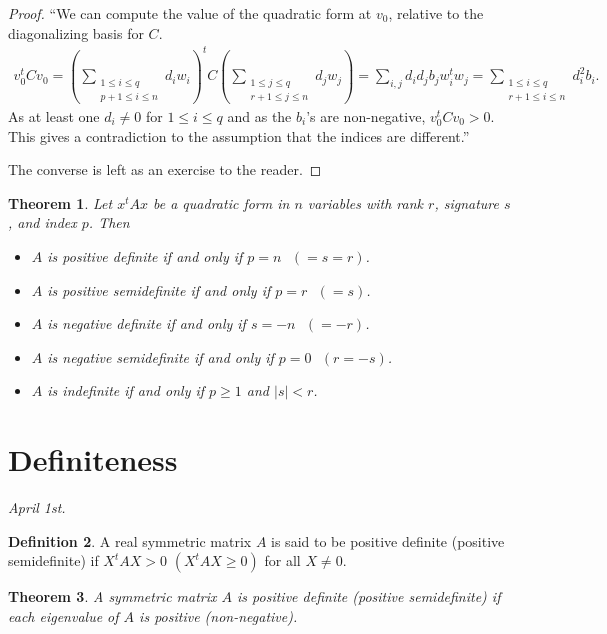 \documentclass[15pt,a4paper]{book}
\newtheorem{theorem}{Theorem}[chapter]
\theoremstyle{definition}
\newtheorem{definition}[theorem]{Definition}
\newcommand{\abs}[1]{\left| #1 \right|} %
\begin{document}
\begin{proof}
    ``We can compute the value of the quadratic form at $v_{0}$, relative to the diagonalizing basis for $C$.
    \begin{align}
        v_{0}^{t}Cv_{0} = (\sum_{\substack{1\leq i\leq q\\ p+1 \leq i \leq n}}d_{i}w_{i})^{t}C (\sum_{\substack{1 \leq j \leq q\\r+1 \leq j \leq n}}d_{j}w_{j}) = \sum_{i,j} d_{i}d_{j}b_{j}w_{i}^{t}w_{j} = \sum_{\substack{1 \leq i \leq q\\r+1 \leq i \leq n}} d_{i}^{2}b_{i}.
    \end{align}
    As at least one $d_{i} \neq 0$ for $1 \leq i \leq q$ and as the $b_{i}$'s are non-negative, $v_{0}^{t}Cv_{0} > 0$. This gives a contradiction to the assumption that the indices are different.''

    The converse is left as an exercise to the reader.
\end{proof}

\begin{theorem}
    Let $x^{t}Ax$ be a quadratic form in $n$ variables with rank $r$, signature $s$, and index $p$. Then
    \begin{itemize}
        \item $A$ is positive definite if and only if $p = n \text{ }(= s = r)$.
        \item $A$ is positive semidefinite if and only if $p = r \text{ } (= s)$.
        \item $A$ is negative definite if and only if $s = -n \text{ } (= -r)$.
        \item $A$ is negative semidefinite if and only if $p = 0 \text{ } (r = -s)$.
        \item $A$ is indefinite if and only if $p \geq 1$ and $\abs{s} < r$.
    \end{itemize}
\end{theorem}

\section{Definiteness}
\textit{April 1st.}
\begin{definition}
    A real symmetric matrix $A$ is said to be positive definite (positive semidefinite) if $X^{t}AX > 0$ $(X^{t}AX \geq 0)$ for all $X \neq 0$.
\end{definition}

\begin{theorem}
    A symmetric matrix $A$ is positive definite (positive semidefinite) if each eigenvalue of $A$ is positive (non-negative). 
\end{theorem}
\end{document}
